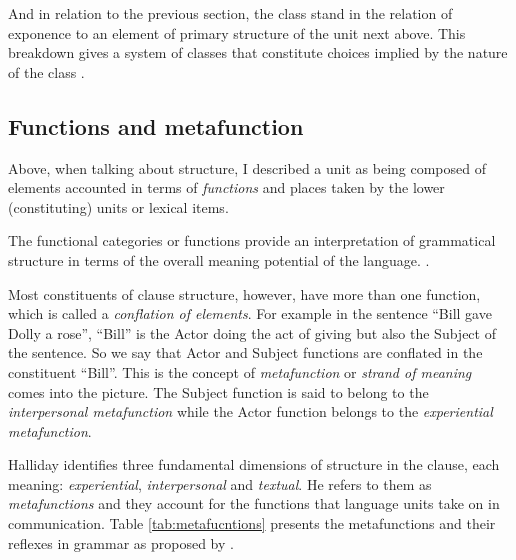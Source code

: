 And in relation to the previous section, the class stand in the relation of exponence to an element of primary structure of the unit next above. This breakdown gives a system of classes that constitute choices implied by the nature of the class \citep[41]{Halliday2002}. 



\subsection{Functions and metafunction}
\label{sec:functions-metafunctions}
Above, when talking about structure, I described a unit as being composed of elements accounted in terms of \textit{functions} and places taken by the lower (constituting) units or lexical items.

\begin{definition}[Function]\label{def:function}
	The functional categories or functions provide an interpretation of grammatical structure in terms of the overall meaning potential of the language. \citep[76]{Halliday2013}.
\end{definition}

Most constituents of clause structure, however, have more than one function, which is called a \textit{conflation of elements}. For example in the sentence ``Bill gave Dolly a rose'', ``Bill'' is the Actor doing the act of giving but also the Subject of the sentence. So we say that Actor and Subject functions are conflated in the constituent ``Bill''. This is the concept of \textit{metafunction} or \textit{strand of meaning} comes into the picture. The Subject function is said to belong to the \textit{interpersonal metafunction} while the Actor function belongs to the \textit{experiential metafunction}. 

Halliday identifies three fundamental dimensions of structure in the clause, each meaning: \textit{experiential}, \textit{interpersonal} and \textit{textual}. He refers to them as \textit{metafunctions} and they account for the functions that language units take on in communication. Table \ref{tab:metafucntions} presents the metafunctions and their reflexes in grammar as proposed by  \citet[85]{Halliday2013}.

